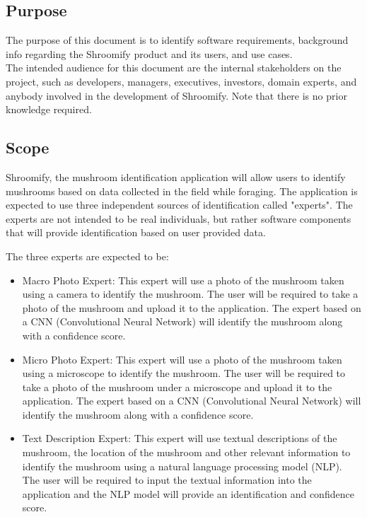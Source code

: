 \documentclass[]{article}
\begin{document}
\subsection{Purpose}
\label{sub:purpose}
The purpose of this document is to identify software requirements, background info regarding the Shroomify product and its users, and use cases. \\

The intended audience for this document are the internal stakeholders on the project, such as developers, managers, executives, investors, domain experts, and anybody involved in the development of Shroomify. Note that there is no prior knowledge required.  


\subsection{Scope}


Shroomify, the mushroom identification application will allow users to identify mushrooms based on data collected in the field while foraging. The application is expected to use three
independent sources of identification called "experts". The experts are not intended to be real individuals, but rather software components that will provide identification based on user provided data. 

\vspace{0.5cm}
\noindent
The three experts are expected to be:

\begin{itemize}
	\item Macro Photo Expert: This expert will use a photo of the mushroom taken using a camera to identify the mushroom. The user will be required to take a photo of the mushroom and upload it to the application. The expert based on a CNN (Convolutional Neural Network) will identify the mushroom along with a confidence score.
	\item Micro Photo Expert: This expert will use a photo of the mushroom taken using a microscope to identify the mushroom. The user will be required to take a photo of the mushroom under a microscope and upload it to the application. The expert based on a CNN (Convolutional Neural Network) will identify the mushroom along with a confidence score.
	\item Text Description Expert: This expert will use textual descriptions of the mushroom, the location of the mushroom and other relevant information to identify the mushroom using a natural language processing model (NLP). The user will be required to input the textual information into the application and the NLP model will provide an identification and confidence score. 
\end{itemize}
\end{document}
